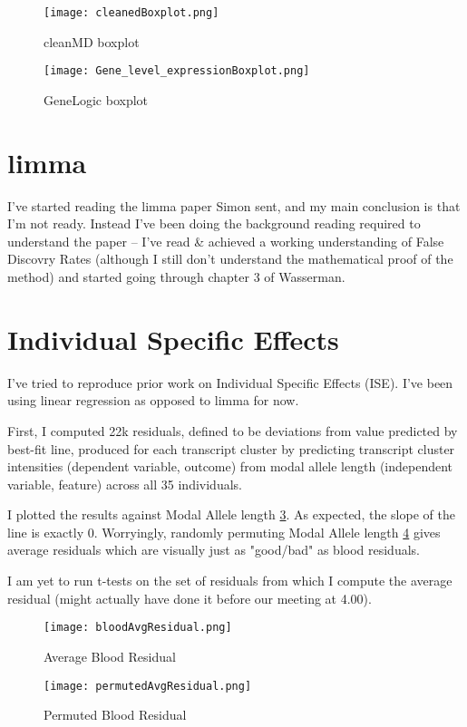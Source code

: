 \documentclass[12pt]{article}
\begin{document}
\begin{figure}[!htb]
\centering
\texttt{[image: cleanedBoxplot.png]}
\caption{cleanMD boxplot \label{cleanMDBoxplot}}
\end{figure}

\begin{figure}[!htb]
\centering
\texttt{[image: Gene\_level\_expressionBoxplot.png]}
\caption{GeneLogic boxplot \label{geneLogicBoxplot}}
\end{figure}

\section{limma}

I've started reading the limma paper Simon sent, and my main conclusion is that I'm not ready. Instead I've been doing the background reading required to understand the paper -- I've read \& achieved a working understanding of False Discovry Rates (although I still don't understand the mathematical proof of the method) and started going through chapter 3 of Wasserman.

\section{Individual Specific Effects}

I've tried to reproduce prior work on Individual Specific Effects (ISE). I've been using linear regression as opposed to limma for now.

First, I computed 22k residuals, defined to be deviations from value predicted by best-fit line, produced for each transcript cluster by predicting transcript cluster intensities (dependent variable, outcome) from modal allele length (independent variable, feature) across all 35 individuals.

I plotted the results against Modal Allele length \ref{bloodAvgResidual}. As expected, the slope of the line is exactly 0. Worryingly, randomly permuting Modal Allele length \ref{permutedAvgResidual} gives average residuals which are visually just as "good/bad" as blood residuals.

I am yet to run t-tests on the set of residuals from which I compute the average residual (might actually have done it before our meeting at 4.00).

\begin{figure}[!htb]
\centering
\texttt{[image: bloodAvgResidual.png]}
\caption{Average Blood Residual \label{bloodAvgResidual}}
\end{figure}


\begin{figure}[!htb]
\centering
\texttt{[image: permutedAvgResidual.png]}
\caption{Permuted Blood Residual \label{permutedAvgResidual}}
\end{figure}

\printbibliography 
\end{document}
